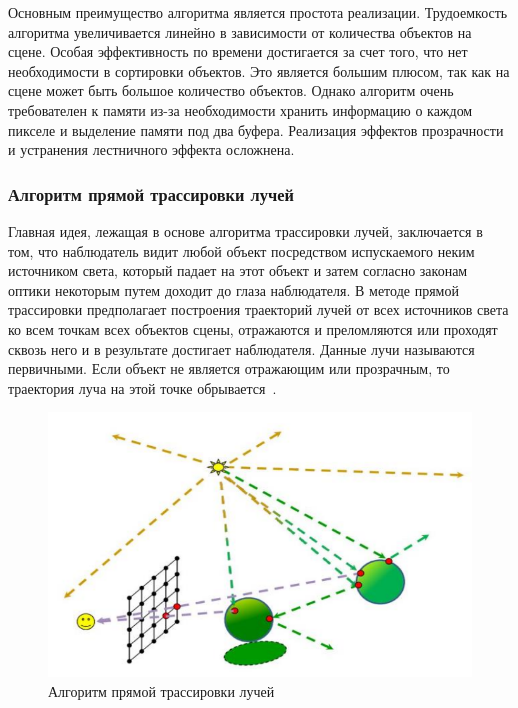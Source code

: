 Основным преимущество алгоритма является простота реализации.
Трудоемкость алгоритма увеличивается линейно в зависимости от количества объектов на сцене.
Особая эффективность по времени достигается за счет того, что нет необходимости в сортировки объектов. 
Это является большим плюсом, так как на сцене может быть большое количество объектов.
Однако алгоритм очень требователен к памяти из-за необходимости хранить информацию о каждом пикселе и выделение памяти под два буфера.
Реализация эффектов прозрачности и устранения лестничного эффекта осложнена.

\subsubsection{Алгоритм прямой трассировки лучей}

Главная идея, лежащая в основе алгоритма трассировки лучей, заключается в том, что наблюдатель видит любой объект посредством испускаемого неким источником света, который падает на этот объект и затем согласно законам оптики некоторым путем доходит до глаза наблюдателя. 
В методе прямой трассировки предполагает построения траекторий лучей от всех источников света ко всем точкам всех объектов сцены, отражаются и преломляются или проходят сквозь него и в результате достигает наблюдателя.
Данные лучи называются первичными.
Если объект не является отражающим или прозрачным, то траектория луча на этой точке обрывается~\cite{roders, ray-tracing}.

\begin{figure}[h]
	\centering
	\includegraphics[height=0.25\textheight]{img/direct-ray-tracing.png}
	\caption{Алгоритм прямой трассировки лучей}
	\label{img:ray-tracing}
\end{figure}


